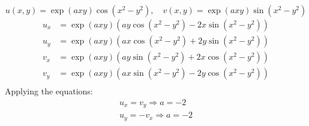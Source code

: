 \documentclass{report}
\renewcommand{\exp}[1]{\operatorname{exp}\left(#1\right)}
\begin{document}
    \begin{equation*}
        u(x,y)=\exp{axy}\cos(x^2-y^2), \quad v(x,y)=\exp{axy}\sin(x^2-y^2)
    \end{equation*}
    \begin{align*}
        u_x&=\exp{axy}(ay\cos(x^2-y^2)-2x\sin(x^2-y^2))\\
        u_y&=\exp{axy}(ax\cos(x^2-y^2)+2y\sin(x^2-y^2)) \\
        v_x&=\exp{axy}(ay\sin(x^2-y^2)+2x\cos(x^2-y^2))\\
        v_y&=\exp{axy}(ax\sin(x^2-y^2)-2y\cos(x^2-y^2)) \\
    \end{align*}
    Applying the equations:\\
    \begin{align*}
        u_x=v_y \Rightarrow a=-2\\
        u_y=-v_x \Rightarrow a=-2\\
    \end{align*}
    
\end{document}
